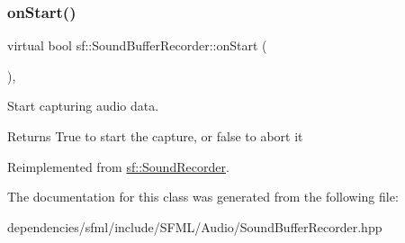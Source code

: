 \subsubsection{\texorpdfstring{on\+Start()}{onStart()}}
{\footnotesize\ttfamily virtual bool sf\+::\+Sound\+Buffer\+Recorder\+::on\+Start (\begin{DoxyParamCaption}{ }\end{DoxyParamCaption})\hspace{0.3cm}{\ttfamily [protected]}, {\ttfamily [virtual]}}



Start capturing audio data. 

\begin{DoxyReturn}{Returns}
True to start the capture, or false to abort it 
\end{DoxyReturn}


Reimplemented from \hyperlink{classsf_1_1_sound_recorder_a7af418fb036201d3f85745bef78ce77f}{sf\+::\+Sound\+Recorder}.



The documentation for this class was generated from the following file\+:\begin{DoxyCompactItemize}
\item 
dependencies/sfml/include/\+S\+F\+M\+L/\+Audio/Sound\+Buffer\+Recorder.\+hpp\end{DoxyCompactItemize}
